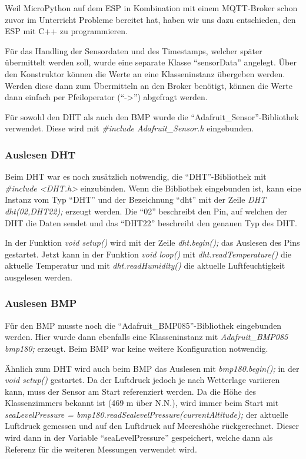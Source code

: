 Weil MicroPython auf dem ESP in Kombination mit einem MQTT-Broker schon 
zuvor im Unterricht Probleme bereitet hat, haben wir uns dazu entschieden, den ESP mit C++ zu programmieren.

Für das Handling der Sensordaten und des Timestamps, welcher später übermittelt werden soll, wurde eine separate Klasse "`sensorData"' angelegt.
Über den Konstruktor können die Werte an eine Klasseninstanz übergeben werden. 
Werden diese dann zum Übermitteln an den Broker benötigt, können die Werte dann einfach per Pfeiloperator ("`->"') abgefragt werden.

Für sowohl den DHT als auch den BMP wurde die "`Adafruit\_Sensor"'-Bibliothek verwendet.
Diese wird mit \textit{\#include Adafruit\_Sensor.h} eingebunden.

\subsubsection{Auslesen DHT}
	Beim DHT war es noch zusätzlich notwendig, die "`DHT"'-Bibliothek mit \textit{\#include <DHT.h>} einzubinden.
	Wenn die Bibliothek eingebunden ist, kann eine Instanz vom Typ "`DHT"' und der Bezeichnung "`dht"' mit der Zeile \textit{DHT dht(02,DHT22);} erzeugt werden.
	Die "`02"' beschreibt den Pin, auf welchen der DHT die Daten sendet und das "`DHT22"' beschreibt den genauen Typ des DHT.
	
	In der Funktion \textit{void setup()} wird mit der Zeile \textit{dht.begin();} das Auslesen des Pins gestartet. 
	Jetzt kann in der Funktion \textit{void loop()} mit \textit{dht.readTemperature()} die aktuelle Temperatur und mit \textit{dht.readHumidity()}
	die aktuelle Luftfeuchtigkeit ausgelesen werden.
	
\subsubsection{Auslesen BMP}
	Für den BMP musste noch die "`Adafruit\_BMP085"'-Bibliothek eingebunden werden.
	Hier wurde dann ebenfalls eine Klasseninstanz mit \textit{Adafruit\_BMP085 bmp180;} erzeugt. Beim BMP war keine weitere Konfiguration notwendig.
	
	Ähnlich zum DHT wird auch beim BMP das Auslesen mit \textit{bmp180.begin();} in der \textit{void setup()} gestartet.
	Da der Luftdruck jedoch je nach Wetterlage variieren kann, muss der Sensor am Start referenziert werden.
	Da die Höhe des Klassenzimmers bekannt ist (469 m über N.N.), wird immer beim Start mit \textit{seaLevelPressure = bmp180.readSealevelPressure(currentAltitude);} der aktuelle Luftdruck gemessen und auf den Luftdruck auf Meereshöhe rückgerechnet. Dieser wird dann in der Variable "`seaLevelPressure"' gespeichert, welche dann als Referenz für die weiteren Messungen verwendet wird.
	
